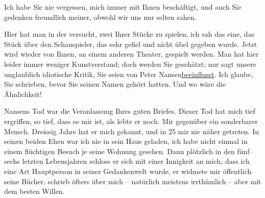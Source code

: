 \pstart
           Ich habe Sie nie vergessen, mich immer mit Ihnen beschäftigt, und auch Sie gedenken
               freundlich meiner, obwohl wir uns nur selten sahen.\pend
           
\pstart
           {\pb}Hier hat man in der \label{K_L02303-1v}\label{K_L02303-1} versucht, zwei Ihrer Stücke zu spielen,
               ich sah das eine, das Stück
               über den Schauspieler, das sehr gefiel und nicht übel gegeben wurde. Jetzt wird
               wieder \label{K_L02303-2v}\label{K_L02303-2} von Ihnen, an einem anderen Theater, gespielt werden. Man hat hier
               leider immer weniger Kunstverstand; doch werden Sie geschätzt; nur sagt unsere
               unglaublich idiotische Kritik, Sie seien von Peter
                  Nansen\uline{beeinflusst}. Ich glaube, Sie schrieben, bevor Sie
               seinen Namen gehört hatten. Und wo wäre die Ähnlichkeit!\pend
           
\pstart
           Nansens Tod war die Veranlassung Ihres guten
               Briefes. Dieser Tod hat mich tief ergriffen, so tief, dass es mir ist, als lebte er
               noch. Mir gegenüber ein sonderbarer Mensch. Dreissig Jahre hat er mich gekannt, und
                  \introOben{}in 25\introOben{} mir nie näher getreten. In seinen beiden Ehen war
               ich nie in sein Haus geladen, ich habe nicht einmal in einem flüchtigen Besuch je
               seine Wohnung {\pb}gesehen. Dann
               plötzlich in den fünf–sechs letzten Lebensjahren schloss er sich mit einer Innigkeit
               an mich, dass ich eine Art Hauptperson in seiner Gedankenwelt wurde, er widmete mir
               öffentlich seine Bücher,
               schrieb öfters über mich – natürlich meistens irrthümlich – aber mit dem besten
               Willen.\pend
           
